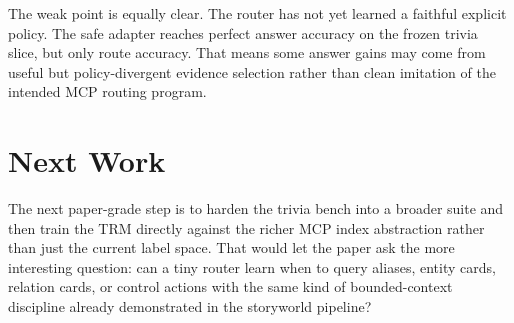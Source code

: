 \documentclass[11pt]{article}
\begin{document}
The weak point is equally clear. The router has not yet learned a faithful explicit policy. The safe adapter reaches perfect answer accuracy on the frozen trivia slice, but only \TriviaRouteSafe{} route accuracy. That means some answer gains may come from useful but policy-divergent evidence selection rather than clean imitation of the intended MCP routing program.

\section{Next Work}
The next paper-grade step is to harden the trivia bench into a broader suite and then train the TRM directly against the richer MCP index abstraction rather than just the current label space. That would let the paper ask the more interesting question: can a tiny router learn when to query aliases, entity cards, relation cards, or control actions with the same kind of bounded-context discipline already demonstrated in the storyworld pipeline?
\end{document}
